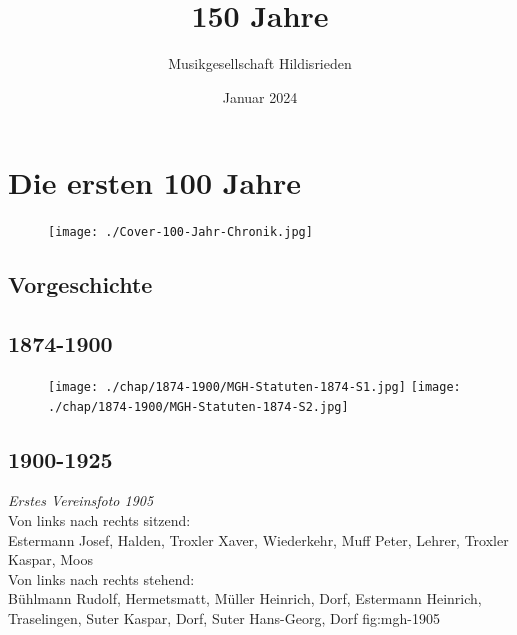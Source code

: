 \documentclass[]{book}
\title{150 Jahre}
\author{Musikgesellschaft Hildisrieden}
\date{Januar 2024}
\begin{document}
\maketitle

\chapter{Die ersten 100 Jahre}
\begin{figure}[ht]
    \texttt{[image: ./Cover-100-Jahr-Chronik.jpg]}
\end{figure}
\section{Vorgeschichte}



\section{1874-1900}

\begin{figure}[ht]
    \texttt{[image: ./chap/1874-1900/MGH-Statuten-1874-S1.jpg]}
    \texttt{[image: ./chap/1874-1900/MGH-Statuten-1874-S2.jpg]}
    \label{fig:Statuten-1874}
\end{figure}


\clearpage

\section{1900-1925}

{\emph{Erstes Vereinsfoto 1905}\\
    Von links nach rechts sitzend:\\
    Estermann Josef, Halden, Troxler Xaver, Wiederkehr, Muff Peter, Lehrer,
    Troxler Kaspar, Moos\\
    Von links nach rechts stehend:\\
    Bühlmann Rudolf, Hermetsmatt, Müller Heinrich, Dorf, Estermann Heinrich,
    Traselingen, Suter Kaspar, Dorf, Suter Hans-Georg, Dorf} {fig:mgh-1905}


\end{document}
